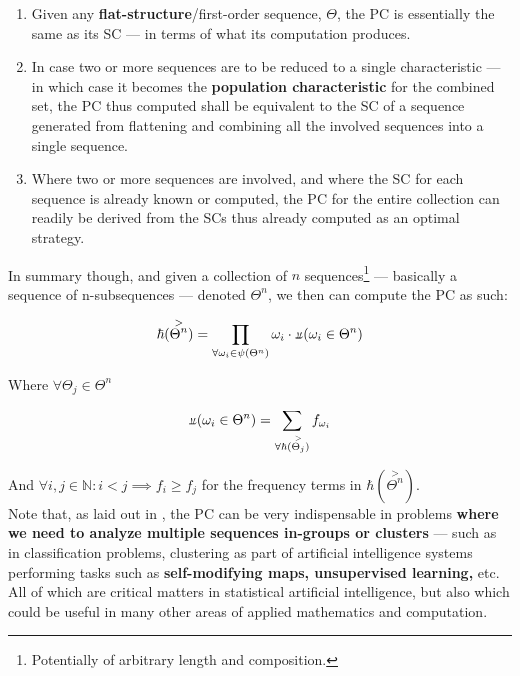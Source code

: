 \documentclass[a4paper, 18pt]{book} %
\newcommand{\invpi}{\rotatebox[origin=c]{180}{$\pi$}}
\begin{document}
\begin{enumerate}
\item Given any \textbf{flat-structure}/first-order sequence, $\Theta$, the PC is essentially the same as its SC --- in terms of what its computation produces.
\item In case two or more sequences are to be reduced to a single characteristic --- in which case it becomes the \textbf{population characteristic} for the combined set, the PC thus computed shall be equivalent to the SC of a sequence generated from flattening and combining all the involved sequences into a single sequence.
\item Where two or more sequences are involved, and where the SC for each sequence is already known or computed, the PC for the entire collection can readily be derived from the SCs thus already computed as an optimal strategy.
\end{enumerate}

In summary though, and given a collection of $n$ sequences\footnote{Potentially of arbitrary length and composition.} --- basically a sequence of n-subsequences --- denoted $\Theta^n$, we then can compute the PC as such:

\vspace{1em}
\begin{equation}
\label{EQPOPCHARb}
\hbar(\overset{>}{\Theta^n}) = \prod\limits_{\forall \omega_i \in \psi(\Theta^n)} \omega_i \cdot \invpi(\omega_i \in \Theta^n)
\end{equation}
\vspace{1em}

Where $\forall \Theta_j \in \Theta^n$

\vspace{1em}
\begin{equation}
\invpi(\omega_i \in \Theta^n) = \sum\limits_{\forall \hbar(\overset{>}{\Theta_j})} f_{\omega_i}
\end{equation}
\vspace{1em}

And $\forall i, j \in \mathbb{N}: i < j \implies f_i \geq f_j$ for the frequency terms in $\hbar(\overset{>}{\Theta^n})$.\\


Note that, as laid out in \cite{lutalo_2025_trans_genetics}, the PC can be very indispensable in problems \textbf{where we need to analyze multiple sequences in-groups or clusters} --- such as in classification problems, clustering as part of artificial intelligence systems performing tasks such as \textbf{self-modifying maps, unsupervised learning,} etc. All of which are critical matters in statistical artificial intelligence, but also which could be useful in many other areas of applied mathematics and computation.\\
\end{document}
